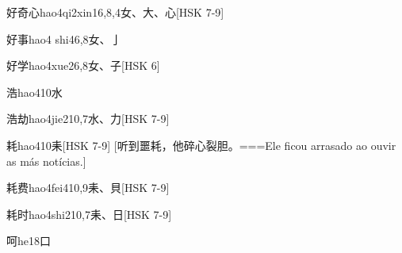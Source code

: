 \begin{EntryWithPhonetic}{好奇心}{hao4qi2xin1}{6,8,4}{⼥、⼤、⼼}[HSK 7-9]
\end{EntryWithPhonetic}

\begin{EntryWithPhonetic}{好事}{hao4 shi4}{6,8}{⼥、⼅}
\end{EntryWithPhonetic}

\begin{EntryWithPhonetic}{好学}{hao4xue2}{6,8}{⼥、⼦}[HSK 6]
\end{EntryWithPhonetic}

\begin{EntryWithPhonetic}{浩}{hao4}{10}{⽔}
\end{EntryWithPhonetic}

\begin{EntryWithPhonetic}{浩劫}{hao4jie2}{10,7}{⽔、⼒}[HSK 7-9]
\end{EntryWithPhonetic}

\begin{EntryWithPhonetic}{耗}{hao4}{10}{⽾}[HSK 7-9]
  [听到噩耗，他碎心裂胆。===Ele ficou arrasado ao ouvir as más notícias.]
\end{EntryWithPhonetic}

\begin{EntryWithPhonetic}{耗费}{hao4fei4}{10,9}{⽾、⾙}[HSK 7-9]
\end{EntryWithPhonetic}

\begin{EntryWithPhonetic}{耗时}{hao4shi2}{10,7}{⽾、⽇}[HSK 7-9]
\end{EntryWithPhonetic}

\begin{EntryWithPhonetic}{呵}{he1}{8}{⼝}
\end{EntryWithPhonetic}

